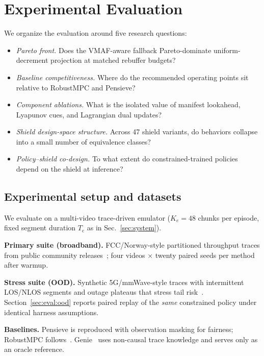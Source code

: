 \documentclass[preprint,12pt,times]{elsarticle}
\providecommand{\VShieldVariants}{47}
\begin{document}
\section{Experimental Evaluation}
\label{sec:eval}

We organize the evaluation around five research questions:

\begin{itemize}
  \item[\textbf{RQ1}] \emph{Pareto front.} Does the VMAF-aware fallback Pareto-dominate uniform-decrement projection at matched rebuffer budgets?
  \item[\textbf{RQ2}] \emph{Baseline competitiveness.} Where do the recommended operating points sit relative to RobustMPC and Pensieve?
  \item[\textbf{RQ3}] \emph{Component ablations.} What is the isolated value of manifest lookahead, Lyapunov cues, and Lagrangian dual updates?
  \item[\textbf{RQ4}] \emph{Shield design-space structure.} Across \VShieldVariants{} shield variants, do behaviors collapse into a small number of equivalence classes?
  \item[\textbf{RQ5}] \emph{Policy--shield co-design.} To what extent do constrained-trained policies depend on the shield at inference?
\end{itemize}

\subsection{Experimental setup and datasets}

We evaluate on a multi-video trace-driven emulator (\(K_e{=}48\) chunks per episode, fixed segment duration \(T_{\mathrm{c}}\) as in Sec.~\ref{sec:system}).

\textbf{Primary suite (broadband).} FCC/Norway-style partitioned throughput traces from public community releases~\cite{fcc2015mba,kvalbein2014}; four videos \(\times\) twenty paired seeds per method after warmup.

\textbf{Stress suite (OOD).} Synthetic 5G/mmWave-style traces with intermittent LOS/NLOS segments and outage plateaus that stress tail risk~\cite{meng2024mmwave}. Section~\ref{sec:eval:ood} reports paired replay of the \emph{same} constrained policy under identical harness assumptions.

\textbf{Baselines.} Pensieve is reproduced with observation masking for fairness; RobustMPC follows~\cite{yin2015control}. Genie~\cite{mao2017neural} uses non-causal trace knowledge and serves only as an oracle reference.
\end{document}
